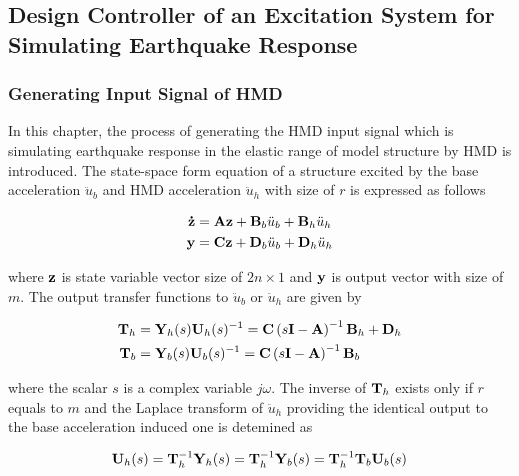 \subsection{Design Controller of an Excitation System for Simulating Earthquake Response}
\subsubsection{Generating Input Signal of HMD}\label{sec:7-5-1}
In this chapter, the process of generating the HMD input signal which is simulating earthquake response in the elastic range of model structure by HMD is introduced. The state-space form equation of a structure excited by the base acceleration $\ddot{u}_{b}$ and HMD acceleration $\ddot{u}_{h}$ with size of $r$ is expressed as follows

\begin{equation}\label{eq:7-11}
\begin{aligned}
\mathbf{\dot{z}}&= \mathbf{A}\mathbf{z} + \mathbf{B}_{b}\ddot{u}_{b}+\mathbf{B}_{h}\ddot{u}_{h}\\
\mathbf{y}&=\mathbf{C}\mathbf{z}+\mathbf{D}_{b}\ddot{u}_{b}+\mathbf{D}_{h}\ddot{u}_{h}
\end{aligned}
\end{equation}

where $\mathbf{z}$ is state variable vector size of $2n\times1$ and $\mathbf{y}$ is output vector with size of $m$. The output transfer functions to $\ddot{u}_{b}$ or $\ddot{u}_{h}$ are given by

\begin{equation}\label{eq:7-12}
\begin{aligned}
\mathbf{T}_{h}&=\mathbf{Y}_{h}(s)\mathbf{U}_{h}(s)^{-1} = \mathbf{C}\left(s\mathbf{I}-\mathbf{A}\right)^{-1}\mathbf{B}_{h} + \mathbf{D}_{h}\\
\mathbf{T}_{b}&=\mathbf{Y}_{b}(s)\mathbf{U}_{b}(s)^{-1} = \mathbf{C}\left(s\mathbf{I}-\mathbf{A}\right)^{-1}\mathbf{B}_{b}
\end{aligned}
\end{equation}

where the scalar $s$ is a complex variable $j\omega$. The inverse of $\mathbf{T}_{h}$ exists only if $r$ equals to $m$ and the Laplace transform of $\ddot{u}_{h}$ providing the identical output to the base acceleration induced one is detemined as

\begin{equation}\label{eq:7-13}
\mathbf{U}_{h}(s) = \mathbf{T}_{h}^{-1}\mathbf{Y}_{h}(s) = \mathbf{T}_{h}^{-1}\mathbf{Y}_{b}(s) = \mathbf{T}_{h}^{-1}\mathbf{T}_{b}\mathbf{U}_{b}(s)
\end{equation}

